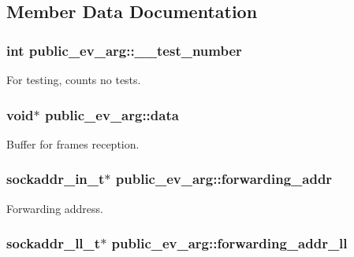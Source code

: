 \subsection{\-Member \-Data \-Documentation}
\hypertarget{structpublic__ev__arg_a9581eaf6fe5eb5ed596b097e15d24f7b}{
\subsubsection[{\-\_\-\-\_\-test\-\_\-number}]{\setlength{\rightskip}{0pt plus 5cm}int {\bf public\-\_\-ev\-\_\-arg\-::\-\_\-\-\_\-test\-\_\-number}}}\label{structpublic__ev__arg_a9581eaf6fe5eb5ed596b097e15d24f7b}
\-For testing, counts no tests. \hypertarget{structpublic__ev__arg_a0ac78f083e007986eea76410d4d0d3d5}{
\subsubsection[{data}]{\setlength{\rightskip}{0pt plus 5cm}void$\ast$ {\bf public\-\_\-ev\-\_\-arg\-::data}}}\label{structpublic__ev__arg_a0ac78f083e007986eea76410d4d0d3d5}
\-Buffer for frames reception. \hypertarget{structpublic__ev__arg_aa6faee62a89e9c23d44e7c7e17041ae9}{
\subsubsection[{forwarding\-\_\-addr}]{\setlength{\rightskip}{0pt plus 5cm}sockaddr\-\_\-in\-\_\-t$\ast$ {\bf public\-\_\-ev\-\_\-arg\-::forwarding\-\_\-addr}}}\label{structpublic__ev__arg_aa6faee62a89e9c23d44e7c7e17041ae9}
\-Forwarding address. \hypertarget{structpublic__ev__arg_aac387a358c08c7677ab02f5fb63737f4}{
\subsubsection[{forwarding\-\_\-addr\-\_\-ll}]{\setlength{\rightskip}{0pt plus 5cm}sockaddr\-\_\-ll\-\_\-t$\ast$ {\bf public\-\_\-ev\-\_\-arg\-::forwarding\-\_\-addr\-\_\-ll}}}\label{structpublic__ev__arg_aac387a358c08c7677ab02f5fb63737f4}
